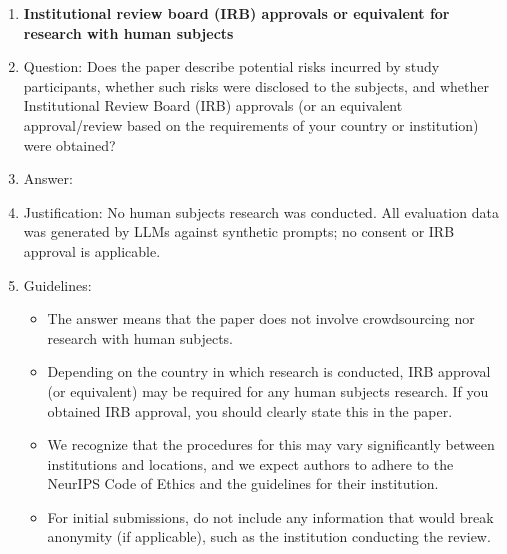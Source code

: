 \begin{enumerate}
\item {\bf Institutional review board (IRB) approvals or equivalent for research with human subjects}
    \item[] Question: Does the paper describe potential risks incurred by study participants, whether such risks were disclosed to the subjects, and whether Institutional Review Board (IRB) approvals (or an equivalent approval/review based on the requirements of your country or institution) were obtained?
    \item[] Answer: \answerNA{}
    \item[] Justification: No human subjects research was conducted. All evaluation data was generated by LLMs against synthetic prompts; no consent or IRB approval is applicable.
    \item[] Guidelines:
    \begin{itemize}
        \item The answer \answerNA{} means that the paper does not involve crowdsourcing nor research with human subjects.
        \item Depending on the country in which research is conducted, IRB approval (or equivalent) may be required for any human subjects research. If you obtained IRB approval, you should clearly state this in the paper.
        \item We recognize that the procedures for this may vary significantly between institutions and locations, and we expect authors to adhere to the NeurIPS Code of Ethics and the guidelines for their institution.
        \item For initial submissions, do not include any information that would break anonymity (if applicable), such as the institution conducting the review.
    \end{itemize}


\end{enumerate}
